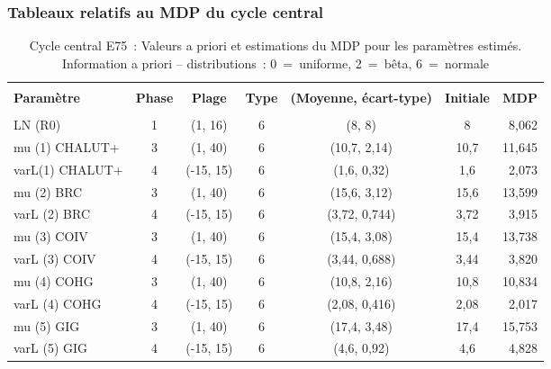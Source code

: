 
\subsubsection{Tableaux relatifs au MDP du cycle central}

\setlength{\tabcolsep}{4pt}
\begin{table}[!h]
\centering
\caption{Cycle central E75~: Valeurs a priori et estimations du MDP pour les param\`{e}tres estim\'{e}s. Information a priori -- distributions~: 0~=~uniforme, 2~=~b\^{e}ta, 6~=~normale}
\label{tab:ymr.parest}
\usefont{\encodingdefault}{\familydefault}{\seriesdefault}{\shapedefault}\small
\begin{tabular}{lcccccr}
\hline \\ [-1.5ex]
{\bf Param\`{e}tre} & {\bf Phase} & {\bf Plage} & {\bf Type} & {\bf (Moyenne, \'{e}cart-type)} & {\bf Initiale} & {\bf MDP} \\ [1ex]
\hline \\ [-1.5ex]
LN (R0) & 1 & (1, 16) & 6 & (8, 8) & 8 & 8,062 \\
mu (1) CHALUT+ & 3 & (1, 40) & 6 & (10,7, 2,14) & 10,7 & 11,645 \\
varL(1) CHALUT+ & 4 & (-15, 15) & 6 & (1,6, 0,32) & 1,6 & 2,073 \\
mu (2) BRC & 3 & (1, 40) & 6 & (15,6, 3,12) & 15,6 & 13,599 \\
varL (2) BRC & 4 & (-15, 15) & 6 & (3,72, 0,744) & 3,72 & 3,915 \\
mu (3) COIV & 3 & (1, 40) & 6 & (15,4, 3,08) & 15,4 & 13,738 \\
varL (3) COIV & 4 & (-15, 15) & 6 & (3,44, 0,688) & 3,44 & 3,820 \\
mu (4) COHG & 3 & (1, 40) & 6 & (10,8, 2,16) & 10,8 & 10,834 \\
varL (4) COHG & 4 & (-15, 15) & 6 & (2,08, 0,416) & 2,08 & 2,017 \\
mu (5) GIG & 3 & (1, 40) & 6 & (17,4, 3,48) & 17,4 & 15,753 \\
varL (5) GIG & 4 & (-15, 15) & 6 & (4,6, 0,92) & 4,6 & 4,828 \\
\hline
\end{tabular}
\usefont{\encodingdefault}{\familydefault}{\seriesdefault}{\shapedefault}\normalsize
\end{table}

